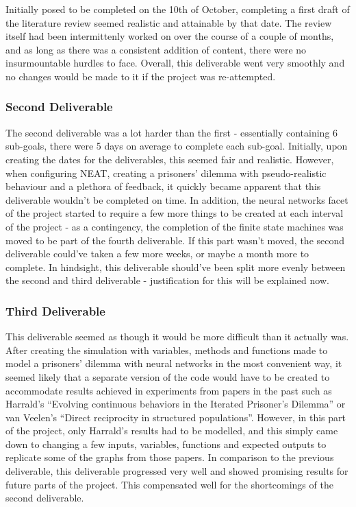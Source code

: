 \documentclass[12pt,a4paper]{article}
\begin{document}
Initially posed to be completed on the 10th of October, completing a first draft of the literature review seemed realistic and attainable by that date. The review itself had been intermittenly worked on over the course of a couple of months, and as long as there was a consistent addition of content, there were no insurmountable hurdles to face. Overall, this deliverable went very smoothly and no changes would be made to it if the project was re-attempted. \\

\subsubsection{Second Deliverable}

The second deliverable was a lot harder than the first - essentially containing 6 sub-goals, there were 5 days on average to complete each sub-goal. Initially, upon creating the dates for the deliverables, this seemed fair and realistic. However, when configuring NEAT, creating a prisoners' dilemma with pseudo-realistic behaviour and a plethora of feedback, it quickly became apparent that this deliverable wouldn't be completed on time. In addition, the neural networks facet of the project started to require a few more things to be created at each interval of the project - as a contingency, the completion of the finite state machines was moved to be part of the fourth deliverable. If this part wasn't moved, the second deliverable could've taken a few more weeks, or maybe a month more to complete. In hindsight, this deliverable should've been split more evenly between the second and third deliverable - justification for this will be explained now.

\subsubsection{Third Deliverable}

This deliverable seemed as though it would be more difficult than it actually was. After creating the simulation with variables, methods and functions made to model a prisoners' dilemma with neural networks in the most convenient way, it seemed likely that a separate version of the code would have to be created to accommodate results achieved in experiments from papers in the past such as Harrald's “Evolving continuous behaviors in the Iterated Prisoner's Dilemma”\cite{25} or van Veelen's “Direct reciprocity in structured populations”.\cite{34} However, in this part of the project, only Harrald's results had to be modelled, and this simply came down to changing a few inputs, variables, functions and expected outputs to replicate some of the graphs from those papers. In comparison to the previous deliverable, this deliverable progressed very well and showed promising results for future parts of the project. This compensated well for the shortcomings of the second deliverable.
\end{document}
